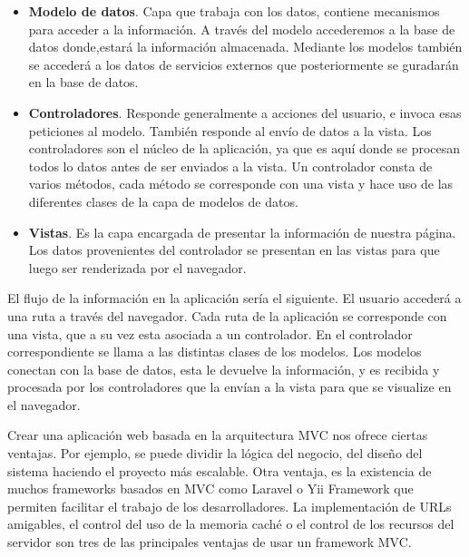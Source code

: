 \begin{itemize}

\item \textbf{Modelo de datos}. Capa que trabaja con los datos, contiene mecanismos para acceder a la información. A través del modelo accederemos a la base de datos donde,estará la información almacenada. Mediante los modelos también se accederá a los datos de servicios externos que posteriormente se guradarán en la base de datos.

\item \textbf{Controladores}. Responde generalmente a acciones del usuario, e invoca esas peticiones al modelo. También responde al envío de datos a la vista. Los controladores son el núcleo de la aplicación, ya que es aquí donde se procesan todos lo datos antes de ser enviados a la vista. Un controlador consta de varios métodos, cada método se corresponde con una vista y hace uso de las diferentes clases de la capa de modelos de datos.

\item \textbf{Vistas}. Es la capa encargada de presentar la información de nuestra página. Los datos provenientes del controlador se presentan en las vistas para que luego ser renderizada por el navegador.

\end{itemize}

 El flujo de la información en la aplicación sería el siguiente. El usuario accederá a una ruta a través del navegador. Cada ruta de la aplicación se corresponde con una vista, que a su vez esta asociada a un controlador. En el controlador correspondiente se llama a las distintas clases de los modelos. Los modelos conectan con la base de datos, esta le devuelve la información, y es recibida y procesada por los controladores que la envían a la vista para que se visualize en el navegador.


\vspace{5 mm}

Crear una aplicación web basada en la arquitectura MVC nos ofrece ciertas ventajas. Por ejemplo, se puede dividir la lógica del negocio, del diseño
del sistema haciendo el proyecto más escalable. Otra ventaja, es la existencia  de muchos frameworks basados en MVC como Laravel o Yii Framework
 que permiten facilitar el trabajo de los desarrolladores. La implementación de URLs amigables, el control del uso de la memoria caché o el control de
los recursos del servidor son tres de las principales ventajas de usar un framework MVC.


